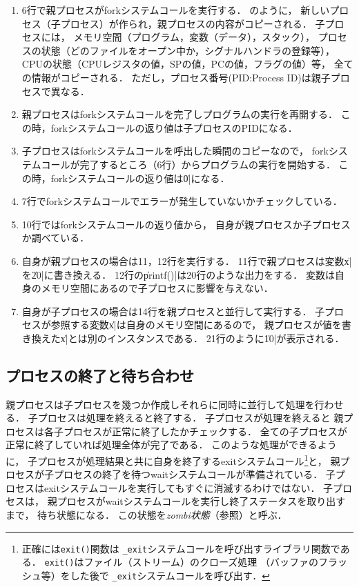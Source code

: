 \begin{description}
  \begin{enumerate}
  \item 6行で親プロセスがforkシステムコールを実行する．
    のように，
    新しいプロセス（子プロセス）が作られ，親プロセスの内容がコピーされる．
    子プロセスには，
    メモリ空間（プログラム，変数（データ），スタック），
    プロセスの状態（どのファイルをオープン中か，シグナルハンドラの登録等），
    CPUの状態（CPUレジスタの値，SPの値，PCの値，フラグの値）等，
    全ての情報がコピーされる．
    ただし，プロセス番号(PID:Process ID)は親子プロセスで異なる．
  \item 親プロセスはforkシステムコールを完了しプログラムの実行を再開する．
    この時，forkシステムコールの返り値は子プロセスのPIDになる．
  \item 子プロセスはforkシステムコールを呼出した瞬間のコピーなので，
    forkシステムコールが完了するところ（6行）からプログラムの実行を開始する．
    この時，forkシステムコールの返り値は\|0|になる．
  \item 7行でforkシステムコールでエラーが発生していないかチェックしている．
  \item 10行ではforkシステムコールの返り値から，
    自身が親プロセスか子プロセスか調べている．
  \item 自身が親プロセスの場合は11，12行を実行する．
    11行で親プロセスは変数\|x|を\|20|に書き換える．
    12行の\|printf()|は20行のような出力をする．
    変数は自身のメモリ空間にあるので子プロセスに影響を与えない．
  \item 自身が子プロセスの場合は14行を親プロセスと並行して実行する．
    子プロセスが参照する変数\|x|は自身のメモリ空間にあるので，
    親プロセスが値を書き換えた\|x|とは別のインスタンスである．
    21行のように\|10|が表示される．
  \end{enumerate}
\end{description}

\subsection{プロセスの終了と待ち合わせ}
親プロセスは子プロセスを幾つか作成しそれらに同時に並行して処理を行わせる．
子プロセスは処理を終えると終了する．
子プロセスが処理を終えると
親プロセスは各子プロセスが正常に終了したかチェックする．
全ての子プロセスが正常に終了していれば処理全体が完了である．
このような処理ができるように，
子プロセスが処理結果と共に自身を終了するexitシステムコール\footnote{
  正確には\texttt{exit()}関数は
  \texttt{\_exit}システムコールを呼び出すライブラリ関数である．
  \texttt{exit()}はファイル（ストリーム）のクローズ処理
  （バッファのフラッシュ等）をした後で
  \texttt{\_exit}システムコールを呼び出す．
}と，
親プロセスが子プロセスの終了を待つwaitシステムコールが準備されている．
子プロセスはexitシステムコールを実行してもすぐに消滅するわけではない．
子プロセスは，
親プロセスがwaitシステムコールを実行し終了ステータスを取り出すまで，
待ち状態になる．
この状態を\emph{zombi状態}（参照）と呼ぶ．

